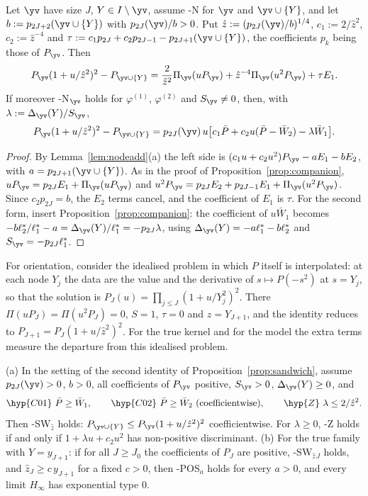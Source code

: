 \begin{proposition}\label{prop:sandwich}
Let $\yv$ have size $J$, $Y\in I\setminus\yv$, assume \hyp{N} for $\yv$ and $\yv\cup\{Y\}$, and let
$b:=p_{2J+2}(\yv\cup\{Y\})$ with $p_{2J}(\yv)/b>0$. Put $\hat z:=(p_{2J}(\yv)/b)^{1/4}$, $c_1:=2/\hat z^2$, $c_2:=\hat z^{-4}$ and
$\tau:=c_1p_{2J}+c_2p_{2J-1}-p_{2J+1}(\yv\cup\{Y\})$, the coefficients $p_k$ being those of $P_{\yv}$. Then
\[
P_{\yv}(1+u/\hat z^2)^2-P_{\yv\cup\{Y\}}=\frac2{\hat z^2}\Pi_{\yv}(uP_{\yv})+\hat z^{-4}\Pi_{\yv}(u^2P_{\yv})+\tau E_1 .
\]
If moreover \hyp{N}$_{\yv}$ holds for $\varphi^{(1)}$, $\varphi^{(2)}$ and $S_{\yv}\ne0$, then, with $\lambda:=\Delta_{\yv}(Y)/S_{\yv}$,
\[
P_{\yv}(1+u/\hat z^2)^2-P_{\yv\cup\{Y\}}=p_{2J}(\yv)\,u\bigl[c_1\bar P+c_2u(\bar P-\bar W_2)-\lambda\bar W_1\bigr].
\]
\end{proposition}

\begin{proof}
By Lemma~\ref{lem:nodeadd}(a) the left side is $(c_1u+c_2u^2)P_{\yv}-aE_1-bE_2$, with $a=p_{2J+1}(\yv\cup\{Y\})$. As in the
proof of Proposition~\ref{prop:companion}, $uP_{\yv}=p_{2J}E_1+\Pi_{\yv}(uP_{\yv})$ and
$u^2P_{\yv}=p_{2J}E_2+p_{2J-1}E_1+\Pi_{\yv}(u^2P_{\yv})$. Since $c_2p_{2J}=b$, the $E_2$ terms cancel, and the coefficient of
$E_1$ is $\tau$. For the second form, insert Proposition~\ref{prop:companion}: the coefficient of $u\bar W_1$ becomes
$-b\ell_2^*/\ell_1^*-a=\Delta_{\yv}(Y)/\ell_1^*=-p_{2J}\lambda$, using $\Delta_{\yv}(Y)=-a\ell_1^*-b\ell_2^*$ and $S_{\yv}=-p_{2J}\ell_1^*$.
\end{proof}

For orientation, consider the idealised problem in which $P$ itself is interpolated: at each node $Y_j$ the data are the
value and the derivative of $s\mapsto P(-s^2)$ at $s=Y_j$, so that the solution is $P_J(u)=\prod_{j\le J}(1+u/Y_j^2)^2$. There
$\Pi(uP_J)=\Pi(u^2P_J)=0$, $S=1$, $\tau=0$ and $\hat z=Y_{J+1}$, and the identity reduces to $P_{J+1}=P_J(1+u/\hat z^2)^2$.
For the true kernel and for the model the extra terms measure the departure from this idealised problem.

\begin{corollary}\label{cor:SW}
(a) In the setting of the second identity of Proposition~\ref{prop:sandwich}, assume $p_{2J}(\yv)>0$, $b>0$, all coefficients
of $P_{\yv}$ positive, $S_{\yv}>0$, $\Delta_{\yv}(Y)\ge0$, and
\[
\hyp{C01}\ \bar P\ge\bar W_1,\qquad \hyp{C02}\ \bar P\ge\bar W_2\ \text{(coefficientwise)},\qquad
\hyp{Z}\ \lambda\le2/\hat z^2 .
\]
Then \hyp{SW$_{\hat z}$} holds: $P_{\yv\cup\{Y\}}\le P_{\yv}(1+u/\hat z^2)^2$ coefficientwise. For $\lambda\ge0$, \hyp{Z} holds
if and only if $1+\lambda u+c_2u^2$ has non-positive discriminant.
(b) For the true family with $Y=y_{J+1}$: if for all $J\ge J_0$ the coefficients of $P_J$ are positive, \hyp{SW$_{\hat z}$}$_J$
holds, and $\hat z_J\ge c\,y_{J+1}$ for a fixed $c>0$, then \hyp{POS$_a$} holds for every $a>0$, and every limit $H_\infty$
has exponential type $0$.
\end{corollary}

